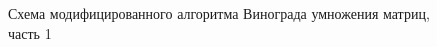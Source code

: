 \documentclass[12pt,a4paper]{report}
\begin{document}
\begin{figure}[h]
    \caption{Схема модифицированного алгоритма Винограда умножения матриц, часть 1}
    \label{fig:image}
\end{figure} 
\end{document}
